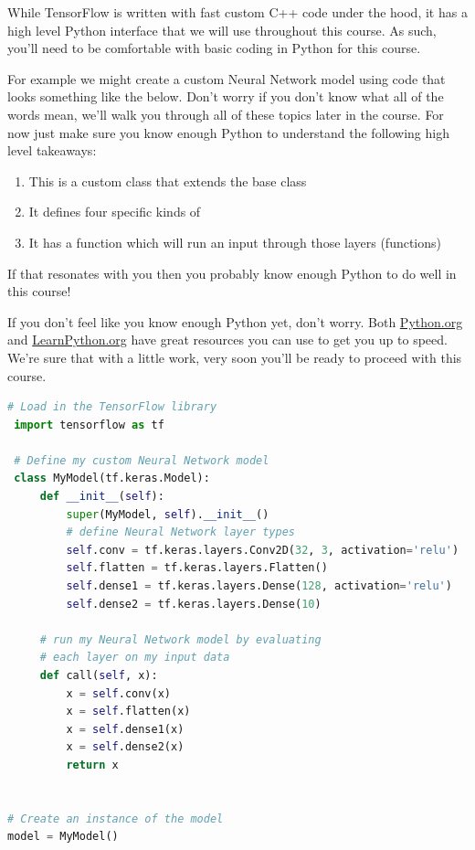 While TensorFlow is written with fast custom C++ code under the hood, it has a high level Python interface that we will use throughout this course. As such, you’ll need to be comfortable with basic coding in Python for this course.

For example we might create a custom Neural Network model using code that looks something like the below. Don’t worry if you don’t know what all of the words mean, we’ll walk you through all of these topics later in the course. For now just make sure you know enough Python to understand the following high level takeaways:


\begin{enumerate}
  \item This is a custom class that extends the  base class
  \item It defines four specific kinds of 
  \item It has a  function which will run an input through those layers (functions)
\end{enumerate}


If that resonates with you then you probably know enough Python to do well in this course!

If you don't feel like you know enough Python yet, don't worry. Both \url{Python.org} and \url{LearnPython.org} have great resources you can use to get you up to speed. We're sure that with a little work, very soon you’ll be ready to proceed with this course.

\begin{code}
    \begin{lstlisting}[language=Python]
 # Load in the TensorFlow library
 import tensorflow as tf
        
 # Define my custom Neural Network model
 class MyModel(tf.keras.Model):
     def __init__(self):
         super(MyModel, self).__init__()
         # define Neural Network layer types
         self.conv = tf.keras.layers.Conv2D(32, 3, activation='relu')
         self.flatten = tf.keras.layers.Flatten()
         self.dense1 = tf.keras.layers.Dense(128, activation='relu')
         self.dense2 = tf.keras.layers.Dense(10)
        
     # run my Neural Network model by evaluating
     # each layer on my input data
     def call(self, x):
         x = self.conv(x)
         x = self.flatten(x)
         x = self.dense1(x)
         x = self.dense2(x)
         return x
        
        
# Create an instance of the model
model = MyModel()
    \end{lstlisting}
    \caption{Simple Example for TensorFlow}
\end{code}

